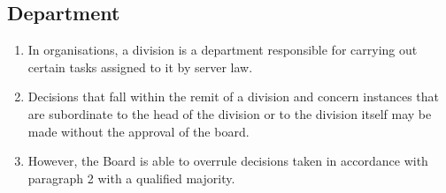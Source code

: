 \documentclass{article}
\begin{document}
\subsection{Department}
\begin{enumerate}[(1)]
	\item In organisations, a division is a department responsible for carrying out certain tasks assigned to it by server law.
	\item Decisions that fall within the remit of a division and concern instances that are subordinate to the head of the division or to the division itself may be made without the approval of the board.
	\item However, the Board is able to overrule decisions taken in accordance with paragraph 2 with a qualified majority.
\end{enumerate}
\end{document}

